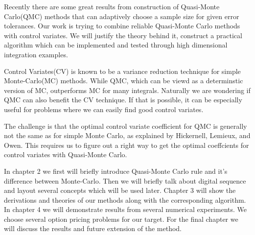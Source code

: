 

Recently there are some great results from construction of Quasi-Monte Carlo(QMC) methods that can adaptively choose a sample size for given error tolerances\cite{hickernell2014reliable}.   
Our work is trying to combine reliable Quasi-Monte Carlo methods with control variates. We will justify the theory behind it, construct a practical algorithm which can be implemented and tested through high dimensional integration examples.


Control Variates(CV) is known to be a variance reduction technique for simple Monte-Carlo(MC) methods\cite{avramidis1996integrated}.
While QMC, which can be viewd as a determinstic version of MC, outperforms MC for many integrals. 
Naturally we are wondering if QMC can also benefit the CV technique. If that is possible, it can be especially useful for problems where we can easily find good control variates.


The challenge is that the optimal control variate coefficient for QMC is generally not the same as for simple Monte Carlo, as explained by Hickernell, Lemieux, and Owen\cite{hickernell2005control}. This requires us to figure out a right way to get the optimal coeffcients for control variates with Quasi-Monte Carlo.


In chapter 2 we first will briefly introduce Quasi-Monte Carlo rule and it's difference between Monte-Carlo. Then we will briefly talk about digital sequence and layout several concepts which will be used later. 
Chapter 3 will show the derivations and theories of our methods along with the corresponding algorithm.
In chapter 4 we will demonstrate results from several numerical experiments. We choose several option pricing problems for our target. For the final chapter we will discuss the results and future extension of the method.
